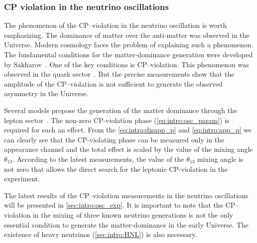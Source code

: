 \documentclass[../main.tex]{subfiles}
\begin{document}
\subsubsection{CP violation in the neutrino oscillations}
\label{sec:intro:cp}
The phenomenon of the CP--violation in the neutrino oscillation is worth emphasizing. The dominance of matter over the anti-matter was observed in the Universe. Modern cosmology faces the problem of explaining such a phenomenon. The fundamental conditions for the matter-dominance generation were developed by Sakharov~\cite{Sakharov1967}. One of the key conditions is CP--violation. This phenomenon was observed in the quark sector~\cite{Tanabashi2018}. But the precise measurements show that the amplitude of the CP--violation is not sufficient to generate the observed asymmetry in the Universe.

Several models propose the generation of the matter dominance through the lepton sector~\cite{Davidson2008}. The non-zero CP-violation phase (\autoref{eq:intro:osc_param}) is required for such an effect. From the \autoref{eq:intro:disapp_p} and \autoref{eq:intro:app_p} we can clearly see that the CP-violating phase can be measured only in the appearance channel and the total effect is scaled by the value of the mixing angle $\theta_{13}$. According to the latest measurements, the value of the $\theta_{13}$ mixing angle is not zero that allows the direct search for the leptonic CP-violation in the experiment.

The latest results of the CP--violation measurements in the neutrino oscillations will be presented in \autoref{sec:intro:osc_exp}. It is important to note that the CP--violation in the mixing of three known neutrino generations is not the only essential condition to generate the matter-dominance in the early Universe. The existence of heavy neutrinos (\autoref{sec:intro:HNL}) is also necessary.
\end{document}

